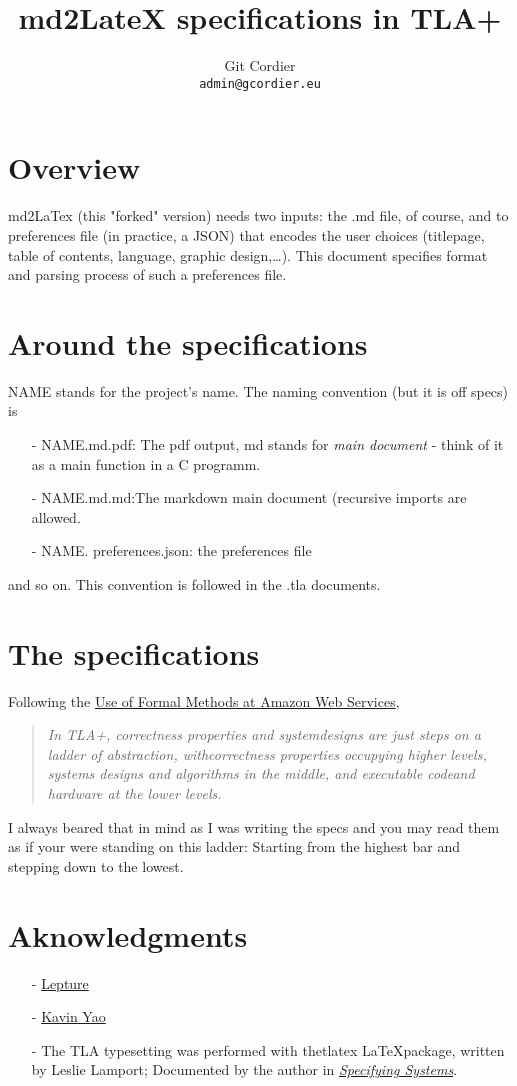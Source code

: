 \documentclass[a4paper, 11pt, titlepage, openany]{article}
\title{md2LateX specifications in TLA+}
\author{Git Cordier \\\texttt{admin@gcordier.eu}}\setlength\parindent{0pt}
\begin{document}

\maketitle
\tableofcontents\newpage
\section{Overview}
md2LaTex (this "forked" version) needs two inputs: the {\fw .md} file, 
of course, and to preferences file (in practice, a JSON) that encodes the user
choices (titlepage, table of contents, language, graphic design,…).
This document specifies format and parsing process of such a preferences file. 
\section{Around the specifications}
NAME stands for the project's name. The naming convention (but it is off specs) is                      
\begin{itemize}
  \item[-]{NAME.md.pdf: The pdf output, md stands for \textit{main document} - 
    think of it as a main function in a C programm. }
  \item[-]{NAME.md.md:The markdown main document (recursive imports are allowed.}
  \item[-]{NAME. preferences.json: the preferences file}
\end{itemize}
and so on. This convention is followed in the {\fw .tla} documents.
\section{The specifications}
Following the \href{https://lamport.azurewebsites.net/tla/formal-methods-amazon.pdf}{Use of Formal Methods at Amazon Web Services}, 
\begin{quote}
    \textit{In TLA+, correctness properties and systemdesigns are just steps on a ladder of abstraction, 
    withcorrectness properties occupying higher levels,
    systems designs and algorithms in the middle, 
    and executable codeand hardware at the lower levels.}
\end{quote}
I always beared that in mind as I was writing the specs and you may read them as if your were standing on this ladder: 
Starting from the highest bar and stepping down to the lowest. 

\newpage
\section{Aknowledgments} 
\begin{itemize}
  \item[-]{\href{https://github.com/lepture/mistune}{Lepture}}
  \item[-]{\href{https://github.com/kavinyao/md2latex}{Kavin Yao}}
  \item[-]{The TLA typesetting was performed with the{\fw tlatex} \LaTeX package, written by Leslie Lamport;
          Documented by the author in 
          \href{https://lamport.azurewebsites.net/tla/book.html}{\textit{Specifying Systems}}.
  }
\end{itemize}
\end{document}
